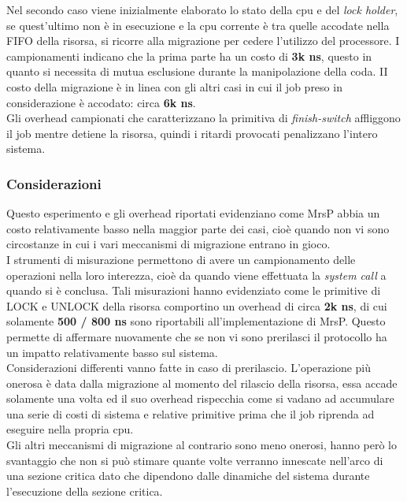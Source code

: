 \noindent Nel secondo caso viene inizialmente elaborato lo stato della cpu e del \textit{lock holder}, se quest'ultimo non è in esecuzione e la cpu corrente è tra quelle accodate nella FIFO della risorsa, si ricorre alla migrazione per cedere l'utilizzo del processore. I campionamenti indicano che la prima parte ha un costo di \textbf{3k ns}, questo in quanto si necessita di mutua esclusione durante la manipolazione della coda. II costo della migrazione è in linea con gli altri casi in cui il job preso in considerazione è accodato: circa \textbf{6k ns}.\\

\noindent Gli overhead campionati che caratterizzano la primitiva di \textit{finish-switch} affliggono il job mentre detiene la risorsa, quindi i ritardi provocati penalizzano l'intero sistema.

\subsubsection{Considerazioni}
\label{sec:overhead_cons}

\noindent Questo esperimento e gli overhead riportati evidenziano come MrsP abbia un costo relativamente basso nella maggior parte dei casi, cioè quando non vi sono circostanze in cui i vari meccanismi di migrazione entrano in gioco.\\

\noindent I strumenti di misurazione permettono di avere un campionamento delle operazioni nella loro interezza, cioè da quando viene effettuata la \textit{system call} a quando si è conclusa. Tali misurazioni hanno evidenziato come le primitive di LOCK e UNLOCK della risorsa comportino un overhead di circa \textbf{2k ns}, di cui solamente \textbf{500 / 800 ns} sono riportabili all'implementazione di MrsP. Questo permette di affermare nuovamente che se non vi sono prerilasci il protocollo ha un impatto relativamente basso sul sistema.\\

\noindent Considerazioni differenti vanno fatte in caso di prerilascio. L'operazione più onerosa è data dalla migrazione al momento del rilascio della risorsa, essa accade solamente una volta ed il suo overhead rispecchia come si vadano ad accumulare una serie di costi di sistema e relative primitive prima che il job riprenda ad eseguire nella propria cpu.\\

\noindent Gli altri meccanismi di migrazione al contrario sono meno onerosi, hanno però lo svantaggio che non si può stimare quante volte verranno innescate nell'arco di una sezione critica dato che dipendono dalle dinamiche del sistema durante l'esecuzione della sezione critica.\\

